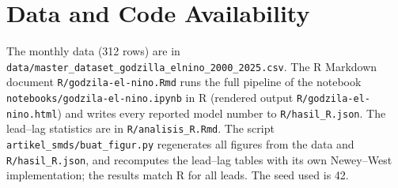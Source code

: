 \documentclass[11pt,twoside]{article}
\begin{document}

\printbibliography[title={References}]

\appendix

\section{Data and Code Availability}
\label{Sec:SuppA}

\sloppy
The monthly data (312 rows) are in \texttt{data/master\_dataset\_godzilla\_elnino\_2000\_2025.csv}. The R Markdown document \texttt{R/godzila-el-nino.Rmd} runs the full pipeline of the notebook \texttt{notebooks/godzila-el-nino.ipynb} in R (rendered output \texttt{R/godzila-el-nino.html}) and writes every reported model number to \texttt{R/hasil\_R.json}. The lead--lag statistics are in \texttt{R/analisis\_R.Rmd}. The script \texttt{artikel\_smds/buat\_figur.py} regenerates all figures from the data and \texttt{R/hasil\_R.json}, and recomputes the lead--lag tables with its own Newey--West implementation; the results match R for all leads. The seed used is 42.
\end{document}
